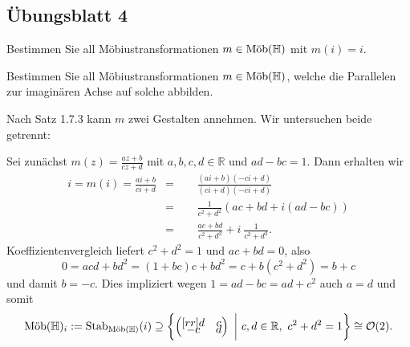 \documentclass[11pt]{book}
\numberwithin{dummy}{section}
\theoremstyle{nonumberbreak}
\newenvironment{prob}[1][]{\ifthenelse{\equal{#1}{}}{\problem}{\problem[#1]}\rm}{\endproblem}
\newenvironment{sol}[1][]{\ifthenelse{\equal{#1}{}}{\solution}{\solution[#1]}\rm}{\endsolution}
\newcommand{\R}{\mathbb{R}}
\newcommand{\He}{\mathbb{H}}
\newcommand{\amob}{\textup{Möb}}
\newcommand{\matx}[4]{\begin{pmatrix}[rr]#1 & #2 \\[-6pt] #3 & #4 \end{pmatrix}}
\begin{document}
\begin{spacing}{1.4}
\newpage




\titlespacing*{\section}{-16.5pt}{0pt}{20pt}
\renewcommand*\thesection{}
\section{Übungsblatt 4} %
\renewcommand*\thesection{\arabic{section}}


\begin{prob}   %
\begin{compactenum}
\item Bestimmen Sie all Möbiustransformationen $m \in \amob(\He)$ mit $m(i)=i$.
\item Bestimmen Sie all Möbiustransformationen $m \in \amob(\He)$, welche die Parallelen zur imaginären Achse auf solche abbilden.
\end{compactenum}

\begin{sol}
\begin{compactenum}
\item Nach Satz 1.7.3 kann $m$ zwei Gestalten annehmen. Wir untersuchen beide getrennt:
\begin{compactenum}
\item Sei zunächst $m(z)=\frac{az+b}{cz+d}$ mit $a,b,c,d \in \R$ und $ad-bc=1$. Dann erhalten wir
\begin{alignat*}{5}
i=m(i)=\frac{ai+b}{ci+d} &=&& \ \  \frac{(ai+b)(-ci+d)}{(ci+d)(-ci+d)}\\  &=&& \ \  \frac{1}{c^2+d^2} \left( ac+bd + i(ad-bc)\right) \\ &=&& \ \  \frac{ac+bd}{c^2+d^2} + i \ \frac{1}{c^2+d^2}.
\end{alignat*}
Koeffizientenvergleich liefert $c^2+d^2=1$ und $ac+bd=0$, also 
$$0=acd+bd^2 = (1+bc)c+bd^2 = c + b(c^2+d^2)=b+c$$
und damit $b=-c$. Dies impliziert wegen $1=ad-bc=ad+c^2$ auch $a=d$ und somit 
$$\amob(\He)_i:= \mathrm{Stab}_{\amob(\He)}(i)\supseteq \left\{ \matx{d}{c}{-c}{d} \ \bigg\vert \ c,d \in \R, \ c^2+d^2=1 \right\} \cong \mathcal{O}(2).$$


\end{compactenum}
\end{compactenum}
\end{sol}
\end{prob}
\end{spacing}
\end{document}
